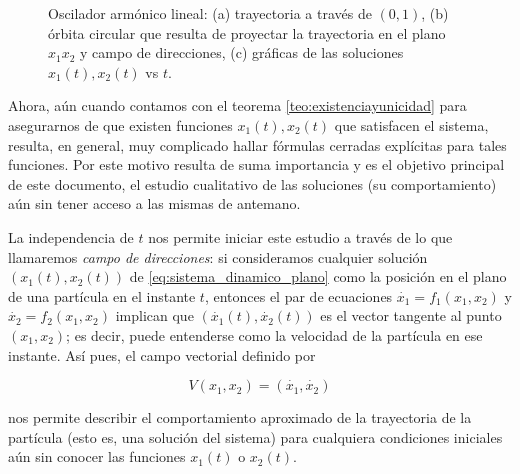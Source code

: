 \documentclass[11pt]{book}
\theoremstyle{definition}
\numberwithin{definition}{section}
\theoremstyle{theorem}
\numberwithin{theorem}{section}
\numberwithin{lemma}{section}
\numberwithin{corollary}{section}
\theoremstyle{plain}
\numberwithin{example}{section}
\begin{document}
\begin{figure}
    \caption{Oscilador armónico lineal: (a) trayectoria a través de $(0,1)$, (b) órbita circular que resulta de proyectar la trayectoria en el plano $x_1x_2$ y campo de direcciones, (c) gráficas de las soluciones $x_1(t), x_2(t)$ vs $t$.}
\end{figure}

Ahora, aún cuando contamos con el teorema \ref{teo:existenciayunicidad} para asegurarnos de que existen funciones $x_1(t), x_2(t)$ que satisfacen el sistema, resulta, en general, muy complicado hallar fórmulas cerradas explícitas para tales funciones. Por este motivo resulta de suma importancia y es el objetivo principal de este documento, el estudio cualitativo de las soluciones (su comportamiento) aún sin tener acceso a las mismas de antemano.

La independencia de $t$ nos permite iniciar este estudio a través de lo que llamaremos \emph{campo de direcciones}: si consideramos cualquier solución $(x_1(t),x_2(t))$ de \ref{eq:sistema_dinamico_plano} como la posición en el plano de una partícula en el instante $t$, entonces el par de ecuaciones $\dot{x_1} = f_1(x_1,x_2)$ y $\dot{x_2} = f_2(x_1,x_2)$ implican que $(\dot{x_1}(t),\dot{x_2}(t))$ es el vector tangente al punto $(x_1,x_2)$; es decir, puede entenderse como la velocidad de la partícula en ese instante. Así pues, el campo vectorial definido por 

$$ V(x_1,x_2) = (\dot{x_1}, \dot{x_2})$$

nos permite describir el comportamiento aproximado de la trayectoria de la partícula (esto es, una solución del sistema) para cualquiera condiciones iniciales aún sin conocer las funciones $x_1(t)$ o $x_2(t)$.
\end{document}
